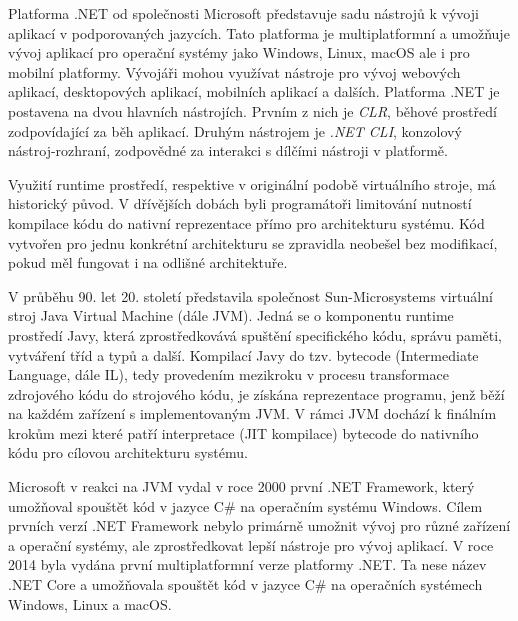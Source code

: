 

Platforma .NET od společnosti Microsoft představuje sadu nástrojů k vývoji aplikací v podporovaných jazycích. Tato platforma je multiplatformní a umožňuje vývoj aplikací pro operační systémy jako Windows, Linux, macOS ale i pro mobilní platformy. Vývojáři mohou využívat nástroje pro vývoj webových aplikací, desktopových aplikací, mobilních aplikací a dalších. Platforma .NET je postavena na dvou hlavních nástrojích. Prvním z nich je \textit{CLR}, běhové prostředí zodpovídající za běh aplikací. Druhým nástrojem je \textit{.NET CLI}, konzolový nástroj-rozhraní, zodpovědné za interakci s dílčími nástroji v platformě. \cite{Richter2012}


Využití runtime prostředí, respektive v originální podobě virtuálního stroje, má historický původ. V dřívějších dobách byli programátoři limitování nutností kompilace kódu do nativní reprezentace přímo pro architekturu systému. Kód vytvořen pro jednu konkrétní architekturu se zpravidla neobešel bez modifikací, pokud měl fungovat i na odlišné architektuře.

V průběhu 90. let 20. století představila společnost Sun-Microsystems virtuální stroj Java Virtual Machine (dále JVM). Jedná se o komponentu runtime prostředí Javy, která zprostředkovává spuštění specifického kódu, správu paměti, vytváření tříd a typů a další. Kompilací Javy do tzv. bytecode (Intermediate Language, dále IL), tedy provedením mezikroku v procesu transformace zdrojového kódu do strojového kódu, je získána reprezentace programu, jenž běží na každém zařízení s implementovaným JVM. V rámci JVM dochází k finálním krokům mezi které patří interpretace (JIT kompilace) bytecode do nativního kódu pro cílovou architekturu systému. 

Microsoft v reakci na JVM vydal v roce 2000 první .NET Framework, který umožňoval spouštět kód v jazyce C\# na operačním systému Windows. Cílem prvních verzí .NET Framework nebylo primárně umožnit vývoj pro různé zařízení a operační systémy, ale zprostředkovat lepší nástroje pro vývoj aplikací. V roce 2014 byla vydána první multiplatformní verze platformy .NET. Ta nese název .NET Core a umožňovala spouštět kód v jazyce C\# na operačních systémech Windows, Linux a macOS. \cite{Richter2012}

